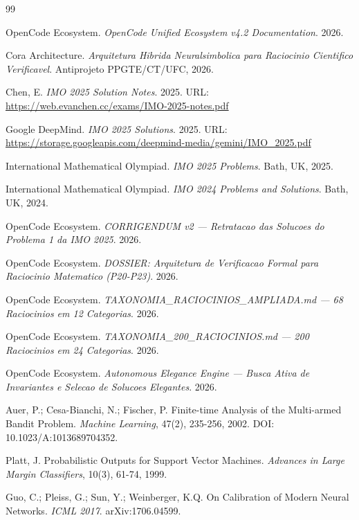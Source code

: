 \documentclass[5p]{elsarticle}
\begin{document}
\begin{thebibliography}{99}

OpenCode Ecosystem. \textit{OpenCode Unified Ecosystem v4.2 Documentation}. 2026.

Cora Architecture. \textit{Arquitetura Hibrida Neuralsimbolica para Raciocinio
Cientifico Verificavel}. Antiprojeto PPGTE/CT/UFC, 2026.

Chen, E. \textit{IMO 2025 Solution Notes}. 2025. URL: \url{https://web.evanchen.cc/exams/IMO-2025-notes.pdf}

Google DeepMind. \textit{IMO 2025 Solutions}. 2025. URL: \url{https://storage.googleapis.com/deepmind-media/gemini/IMO_2025.pdf}

International Mathematical Olympiad. \textit{IMO 2025 Problems}. Bath, UK, 2025.

International Mathematical Olympiad. \textit{IMO 2024 Problems and Solutions}. Bath, UK, 2024.

OpenCode Ecosystem. \textit{CORRIGENDUM v2 — Retratacao das Solucoes do Problema 1 da IMO 2025}. 2026.

OpenCode Ecosystem. \textit{DOSSIER: Arquitetura de Verificacao Formal para Raciocinio Matematico (P20-P23)}. 2026.

OpenCode Ecosystem. \textit{TAXONOMIA\_RACIOCINIOS\_AMPLIADA.md — 68 Raciocinios em 12 Categorias}. 2026.

OpenCode Ecosystem. \textit{TAXONOMIA\_200\_RACIOCINIOS.md — 200 Raciocinios em 24 Categorias}. 2026.

OpenCode Ecosystem. \textit{Autonomous Elegance Engine — Busca Ativa de Invariantes e Selecao de Solucoes Elegantes}. 2026.

Auer, P.; Cesa-Bianchi, N.; Fischer, P. Finite-time Analysis of the Multi-armed Bandit Problem. \textit{Machine Learning}, 47(2), 235-256, 2002. DOI: 10.1023/A:1013689704352.

Platt, J. Probabilistic Outputs for Support Vector Machines. \textit{Advances in Large Margin Classifiers}, 10(3), 61-74, 1999.

Guo, C.; Pleiss, G.; Sun, Y.; Weinberger, K.Q. On Calibration of Modern Neural Networks. \textit{ICML 2017}. arXiv:1706.04599.


\end{thebibliography}
\end{document}
